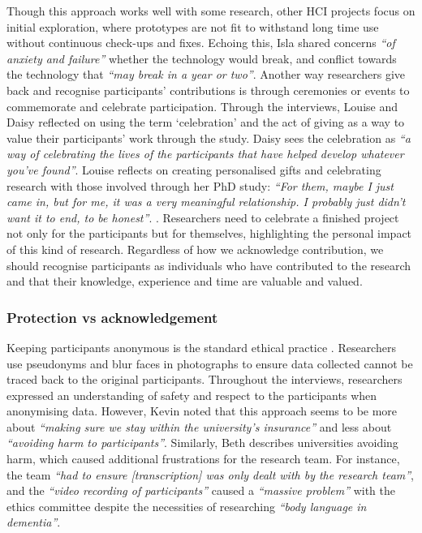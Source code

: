 Though this approach works well with some research, other HCI projects focus on initial exploration, where prototypes are not fit to withstand long time use without continuous check-ups and fixes. Echoing this, Isla shared concerns \textit{``of anxiety and failure''} whether the technology would break, and conflict towards the technology that \textit{``may break in a year or two''}. Another way researchers give back and recognise participants' contributions is through ceremonies or events to commemorate and celebrate participation. Through the interviews, Louise and Daisy reflected on using the term `celebration' and the act of giving as a way to value their participants' work through the study. Daisy sees the celebration as \textit{``a way of celebrating the lives of the participants that have helped develop whatever you’ve found''}. Louise reflects on creating personalised gifts and celebrating research with those involved through her PhD study: \textit{``For them, maybe I just came in, but for me, it was a very meaningful relationship. I probably just didn’t want it to end, to be honest''}. . Researchers need to celebrate a finished project not only for the participants but for themselves, highlighting the personal impact of this kind of research. Regardless of how we acknowledge contribution, we should recognise participants as individuals who have contributed to the research and that their knowledge, experience and time are valuable and valued.

\subsubsection{Protection vs acknowledgement}
\label{Ethics:ThemeOnePartThree}

Keeping participants anonymous is the standard ethical practice \citep{novak_anonymity_2014}. Researchers use pseudonyms and blur faces in photographs to ensure data collected cannot be traced back to the original participants. Throughout the interviews, researchers expressed an understanding of safety and respect to the participants when anonymising data. However, Kevin noted that this approach seems to be more about \textit{``making sure we stay within the university's insurance''} and less about \textit{``avoiding harm to participants''}. Similarly, Beth describes universities avoiding harm, which caused additional frustrations for the research team. For instance, the team \textit{``had to ensure [transcription] was only dealt with by the research team''}, and the \textit{``video recording of participants''} caused a \textit{``massive problem''} with the ethics committee despite the necessities of researching \textit{``body language in dementia''}. 

